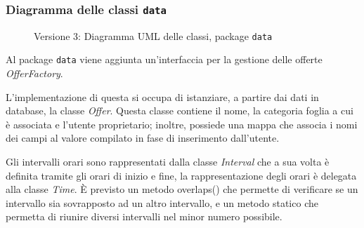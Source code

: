 \subsubsection{Diagramma delle classi \texttt{data}}
\vspace{0.5cm}
\begin{figure}[H]
    \centering
    \caption{Versione 3: Diagramma UML delle classi, package \texttt{data}}
    \label{fig:class_data_v_3}
\end{figure}

Al package \texttt{data} viene aggiunta un'interfaccia per la gestione delle offerte \textit{OfferFactory}.

L'implementazione di questa si occupa di istanziare, a partire dai dati in database, la classe \textit{Offer}.
Questa classe contiene il nome, la categoria foglia a cui è associata e l'utente proprietario; inoltre, possiede una mappa che associa i nomi dei campi al valore compilato in fase di inserimento dall'utente.

Gli intervalli orari sono rappresentati dalla classe \textit{Interval} che a sua volta è definita tramite gli orari di inizio e fine, la rappresentazione
degli orari è delegata alla classe \textit{Time}. È previsto un metodo overlaps() che permette di verificare se un intervallo sia sovrapposto
ad un altro intervallo, e un metodo statico che permetta di riunire diversi intervalli nel minor numero possibile.